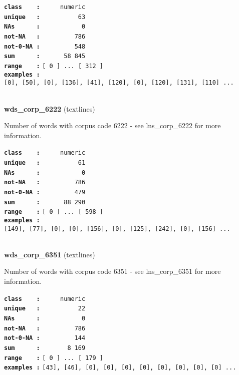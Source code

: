 \documentclass[]{article}
\begin{document}
\textbf{\texttt{class\ \ \ \ :}} \texttt{~~~~~numeric}\\
\textbf{\texttt{unique\ \ \ :}} \texttt{~~~~~~~~~~63}\\
\textbf{\texttt{NAs\ \ \ \ \ \ :}} \texttt{~~~~~~~~~~~0}\\
\textbf{\texttt{not-NA\ \ \ :}} \texttt{~~~~~~~~~786}\\
\textbf{\texttt{not-0-NA\ :}} \texttt{~~~~~~~~~548}\\
\textbf{\texttt{sum\ \ \ \ \ \ :}} \texttt{~~~~~~58~845}\\
\textbf{\texttt{range\ \ \ \ :}}
\texttt{{[}\ 0\ {]}\ ...\ {[}\ 312\ {]}}\\
\textbf{\texttt{examples\ :}}
\texttt{{[}0{]},\ {[}50{]},\ {[}0{]},\ {[}136{]},\ {[}41{]},\ {[}120{]},\ {[}0{]},\ {[}120{]},\ {[}131{]},\ {[}110{]}\ ...}\\

~

\textbf{wds\_corp\_6222} (textlines)

Number of words with corpus code 6222 - see lns\_corp\_6222 for more
information.

\textbf{\texttt{class\ \ \ \ :}} \texttt{~~~~~numeric}\\
\textbf{\texttt{unique\ \ \ :}} \texttt{~~~~~~~~~~61}\\
\textbf{\texttt{NAs\ \ \ \ \ \ :}} \texttt{~~~~~~~~~~~0}\\
\textbf{\texttt{not-NA\ \ \ :}} \texttt{~~~~~~~~~786}\\
\textbf{\texttt{not-0-NA\ :}} \texttt{~~~~~~~~~479}\\
\textbf{\texttt{sum\ \ \ \ \ \ :}} \texttt{~~~~~~88~290}\\
\textbf{\texttt{range\ \ \ \ :}}
\texttt{{[}\ 0\ {]}\ ...\ {[}\ 598\ {]}}\\
\textbf{\texttt{examples\ :}}
\texttt{{[}149{]},\ {[}77{]},\ {[}0{]},\ {[}0{]},\ {[}156{]},\ {[}0{]},\ {[}125{]},\ {[}242{]},\ {[}0{]},\ {[}156{]}\ ...}\\

~

\textbf{wds\_corp\_6351} (textlines)

Number of words with corpus code 6351 - see lns\_corp\_6351 for more
information.

\textbf{\texttt{class\ \ \ \ :}} \texttt{~~~~~numeric}\\
\textbf{\texttt{unique\ \ \ :}} \texttt{~~~~~~~~~~22}\\
\textbf{\texttt{NAs\ \ \ \ \ \ :}} \texttt{~~~~~~~~~~~0}\\
\textbf{\texttt{not-NA\ \ \ :}} \texttt{~~~~~~~~~786}\\
\textbf{\texttt{not-0-NA\ :}} \texttt{~~~~~~~~~144}\\
\textbf{\texttt{sum\ \ \ \ \ \ :}} \texttt{~~~~~~~8~169}\\
\textbf{\texttt{range\ \ \ \ :}}
\texttt{{[}\ 0\ {]}\ ...\ {[}\ 179\ {]}}\\
\textbf{\texttt{examples\ :}}
\texttt{{[}43{]},\ {[}46{]},\ {[}0{]},\ {[}0{]},\ {[}0{]},\ {[}0{]},\ {[}0{]},\ {[}0{]},\ {[}0{]},\ {[}0{]}\ ...}\\
\end{document}

